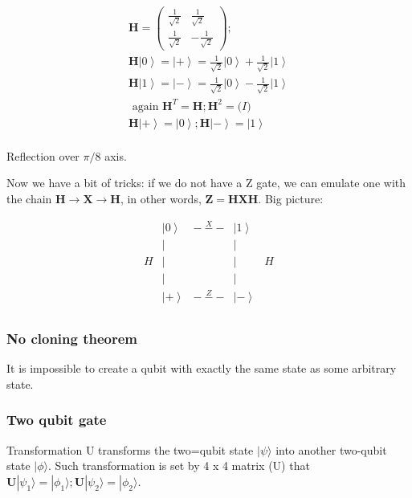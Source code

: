\documentclass{scrartcl}
\newcommand{\ket}[1]{\left| #1 \right>} %
\begin{document}
\begin{itemize}
  \begin{gather*}
    \mathbf{H} = \left( \begin{array}{cc} \frac1{\sqrt{2}} & \frac1{\sqrt{2}} \\
        \frac1{\sqrt{2}} & - \frac1{\sqrt{2}}
      \end{array} \right);\\
    \mathbf{H} \ket0 = \ket+ = \frac1{\sqrt{2}} \ket0 +
    \frac1{\sqrt{2}} \ket1 \\
    \mathbf{H} \ket1 = \ket- = \frac1{\sqrt{2}} \ket0 -
    \frac1{\sqrt{2}} \ket1 \\
    \mbox{ again }  \mathbf{H}^T = \mathbf{H}; \mathbf{H}^2 = \mathbf(I) \\
    \mathbf{H} \ket+ = \ket0; \mathbf{H} \ket- = \ket1\\
  \end{gather*}

  Reflection over $\pi / 8 $ axis.
\end{itemize}

Now we have a bit of tricks: if we do not have a Z gate, we can emulate one with
the chain $\mathbf{H} \to \mathbf{X} \to \mathbf{H}$, in other words,
$\mathbf{Z} = \mathbf{H} \mathbf{X} \mathbf{H}$. Big picture:

$$\begin{array}{ccccc}
  &\ket0 & \stackrel{X}{---} & \ket1 & \\
  & | & & | &  \\
  H & | & & | & H \\
  & | & & | & \\
  &\ket+ &  \stackrel{Z}{---} & \ket- & \\
\end{array}$$

\subsubsection{No cloning theorem}
\label{sec:5-5}

It is impossible to create a qubit with exactly the same state as some arbitrary
state.

\subsubsection{Two qubit gate}
\label{sec:5-5-1}

Transformation U transforms the two=qubit state $|\psi \rangle$ into another
two-qubit state $|\phi\rangle$. Such transformation is set by 4 x 4 matrix (U)
that $\mathbf{U} |\psi_1 \rangle = |\phi_1 \rangle; \mathbf{U} | \psi_2 \rangle
= | \phi_2 \rangle$.
\end{document}
